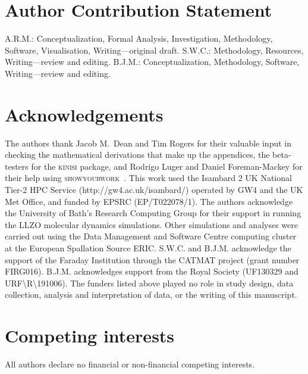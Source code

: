 \documentclass[reprint,superscriptaddress,nobibnotes,amsmath,amssymb,aps,prx,hidelinks,linenumbers]{revtex4-2}
\begin{document}
\section*{Author Contribution Statement}

A.R.M.: Conceptualization, Formal Analysis, Investigation, Methodology, Software, Visualisation, Writing---original draft.
S.W.C.: Methodology, Resources, Writing---review and editing.
B.J.M.: Conceptualization, Methodology, Software, Writing---review and editing.

\section*{Acknowledgements}

The authors thank Jacob M.\ Dean and Tim Rogers for their valuable input in checking the mathematical derivations that make up the appendices, the beta-testers for the \textsc{kinisi} package, and Rodrigo Luger and Daniel Foreman-Mackey for their help using \textsc{showyourwork}~\cite{luger_showyourwork_2021}.
This work used the Isambard 2 UK National Tier-2 HPC Service (http://gw4.ac.uk/isambard/) operated by GW4 and the UK Met Office, and funded by EPSRC (EP/T022078/1).
The authors acknowledge the University of Bath's Research Computing Group for their support in running the LLZO molecular dynamics simulations.
Other simulations and analyses were carried out using the Data Management and Software Centre computing cluster at the European Spallation Source ERIC.
S.W.C. and B.J.M. acknowledge the support of the Faraday Institution through the CATMAT project (grant number FIRG016). 
B.J.M. acknowledges support from the Royal Society (UF130329 and URF\textbackslash R\textbackslash 191006). 
The funders listed above played no role in study design, data collection, analysis and interpretation of data, or the writing of this manuscript.

\section*{Competing interests}
All authors declare no financial or non-financial competing interests.



\let\addcontentsline\oldaddcontentsline

\onecolumngrid
\clearpage 
\twocolumngrid

\appendix
\renewcommand\thesection{SI.\Roman{section}}
\renewcommand\thefigure{SI.\arabic{figure}}
\setcounter{figure}{0}
\renewcommand\theequation{SI.\arabic{equation}}
\setcounter{equation}{0}
\renewcommand\thetable{SI.\arabic{table}}
\setcounter{table}{0}
\renewcommand\thepage{SI.\arabic{page}}
\end{document}
